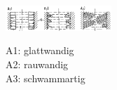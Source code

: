 \begin{minipage}{0.6\linewidth}
    \includegraphics[width = 40mm]{src/images/Exogene Erstarrung.png}
\end{minipage}
\begin{minipage}{0.3\linewidth}
    A1: glattwandig\\
    A2: rauwandig\\
    A3: schwammartig
\end{minipage}
